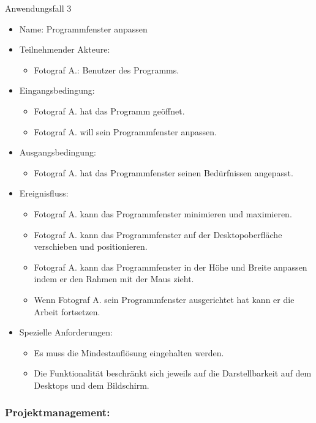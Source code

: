 \begin{description}
	\item[Anwendungsfall 3]
	\end{description}
	
	\begin{itemize}
		\item Name: Programmfenster anpassen
		\item Teilnehmender Akteure:
		\begin{itemize}
			\item	Fotograf A.: Benutzer des Programms.
		\end{itemize}
		\item Eingangsbedingung:
		\begin{itemize}
			\item Fotograf A. hat das Programm geöffnet.
			\item Fotograf A. will sein Programmfenster anpassen.						
		\end{itemize}
		\item Ausgangsbedingung:
		\begin{itemize}
			\item	Fotograf A. hat das Programmfenster seinen Bedürfnissen angepasst.		
		\end{itemize}
		\item Ereignisfluss:	
		\begin{itemize}
			\item Fotograf A. kann das Programmfenster minimieren und maximieren.
			\item Fotograf A. kann das Programmfenster auf der Desktopoberfläche verschieben und positionieren.
			\item Fotograf A. kann das Programmfenster in der Höhe und Breite anpassen indem er den Rahmen mit der Maus zieht.
			\item Wenn Fotograf A. sein Programmfenster ausgerichtet hat kann er die Arbeit fortsetzen.
		\end{itemize}
		\item Spezielle Anforderungen:
		\begin{itemize}
			\item	Es muss die Mindestauflösung eingehalten werden.
			\item Die Funktionalität beschränkt sich jeweils auf die Darstellbarkeit auf dem Desktops und dem Bildschirm.
		\end{itemize}
	\end{itemize}	
	
	\subsubsection{Projektmanagement:}
		

